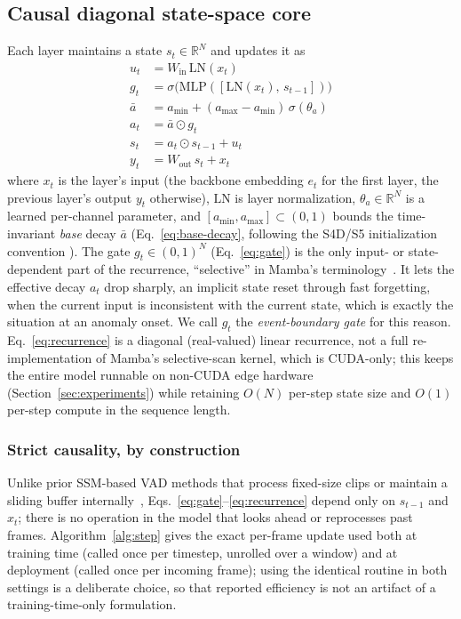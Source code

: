 \subsection{Causal diagonal state-space core}
\label{sec:method-ssm}
Each layer maintains a state $s_t \in \mathbb{R}^N$ and updates it as
\begin{align}
  u_t &= W_{\text{in}}\, \mathrm{LN}(x_t) \\
  g_t &= \sigma\big(\mathrm{MLP}([\mathrm{LN}(x_t),\, s_{t-1}])\big) \label{eq:gate}\\
  \bar{a} &= a_{\min} + (a_{\max}-a_{\min})\, \sigma(\theta_a) \label{eq:base-decay}\\
  a_t &= \bar{a} \odot g_t \\
  s_t &= a_t \odot s_{t-1} + u_t \label{eq:recurrence}\\
  y_t &= W_{\text{out}}\, s_t + x_t
\end{align}
where $x_t$ is the layer's input (the backbone embedding $e_t$ for the
first layer, the previous layer's output $y_t$ otherwise), $\mathrm{LN}$
is layer normalization, $\theta_a \in \mathbb{R}^N$ is a learned
per-channel parameter, and $[a_{\min}, a_{\max}] \subset (0,1)$ bounds the
time-invariant \emph{base} decay $\bar{a}$ (Eq.~\ref{eq:base-decay},
following the S4D/S5 initialization convention \cite{gu2022s4,smith2023s5}).
The gate $g_t \in (0,1)^N$ (Eq.~\ref{eq:gate}) is the only input- or state-dependent part of the recurrence, ``selective'' in Mamba's terminology~\cite{gu2023mamba}. It lets the effective decay $a_t$ drop sharply, an implicit state reset through fast forgetting, when the current input is inconsistent with the current state, which is exactly the situation at an anomaly onset. We call $g_t$ the \emph{event-boundary gate} for this reason.
Eq.~\ref{eq:recurrence} is a diagonal (real-valued) linear recurrence,
not a full re-implementation of Mamba's selective-scan kernel, which is
CUDA-only; this keeps the entire model runnable on non-CUDA edge hardware
(Section~\ref{sec:experiments}) while retaining $O(N)$ per-step
state size and $O(1)$ per-step compute in the sequence length.

\subsubsection{Strict causality, by construction}
Unlike prior SSM-based VAD methods that process fixed-size clips or maintain a sliding buffer internally~\cite{vadmamba2025,wavemambaad2025}, Eqs.~\ref{eq:gate}--\ref{eq:recurrence} depend only on $s_{t-1}$ and $x_t$; there is no operation in the model that looks ahead or reprocesses past frames. Algorithm~\ref{alg:step}
gives the exact per-frame update used both at training time (called once
per timestep, unrolled over a window) and at deployment (called once per
incoming frame); using the identical routine in both settings is a
deliberate choice, so that reported efficiency is not an artifact of a
training-time-only formulation.

